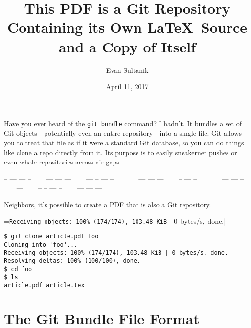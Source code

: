 \documentclass{article}
\def\thindivider{\centerline{\tiny%
-- --- --- -- ~~~ --- --- --- ~~~ --- -- --- -- ~~~~~~
--- --- --- ~~~  -- --- -- ~~~~~~
--- --- -- ~~~ --- ~~~ -- -- --- -- ~~~ --- --- ---}}
\begin{document}
\title{This PDF is a Git Repository\\Containing its Own \LaTeX\ Source\\and a Copy of Itself}
\author{Evan Sultanik}
\date{April 11, 2017}

\maketitle

Have you ever heard of the \texttt{git bundle} command? I hadn't. It
bundles a set of Git objects---potentially even an entire
repository---into a single file. Git allows you to treat that file as
if it were a standard Git database, so you can do things like clone a
repo directly from it. Its purpose is to easily sneakernet pushes or
even whole repositories across air gaps.

\thindivider

Neighbors, it's possible to create a PDF that is also a Git
repository.

\begin{center}
\begingroup
{}=\hbox{\footnotesize\verb|Receiving objects: 100% (174/174), 103.48 KiB | 0 bytes/s, done.|}
\begin{minipage}{\wd9}
\footnotesize\begin{verbatim}
$ git clone article.pdf foo
Cloning into 'foo'...
Receiving objects: 100% (174/174), 103.48 KiB | 0 bytes/s, done.
Resolving deltas: 100% (100/100), done.
$ cd foo
$ ls
article.pdf article.tex
\end{verbatim}
\end{minipage}
\endgroup
\end{center}

\section{The Git Bundle File Format}
\label{sec:GitBundleFormat}
\end{document}

